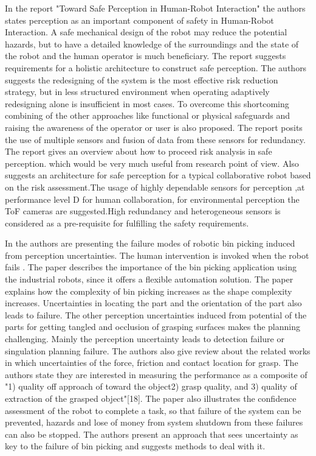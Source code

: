 {In the report "Toward Safe Perception in Human-Robot Interaction" \cite{author17} the authors states perception as an important component of safety in Human-Robot Interaction. A safe mechanical design of the robot may reduce the potential hazards, but to have a detailed knowledge of the surroundings and the state of the robot and the human operator is much beneficiary. The report suggests requirements for a holistic architecture to construct safe perception. The authors suggests the redesigning of the system is the most effective risk reduction strategy, but in less structured environment when operating adaptively redesigning alone is insufficient in most cases. To overcome this shortcoming combining of the other approaches like functional or physical safeguards and raising the awareness of the operator or user is also proposed. The report posits the use of multiple sensors and fusion of data from these sensors for redundancy. The report gives an overview about how to proceed risk analysis in safe perception. which would be very much useful from research point of view. Also suggests an architecture for safe perception for a typical collaborative robot based on the risk assessment.The usage of highly dependable sensors for perception ,at performance level D for human collaboration, for environmental perception the ToF cameras are suggested.High redundancy and heterogeneous sensors is considered as a pre-requisite for fulfilling the safety requirements. 

In\cite{author18} the authors are presenting the failure modes of robotic bin picking induced from perception uncertainties. The human intervention is invoked when the robot fails . The paper describes the importance of the bin picking application using the industrial robots, since it offers a flexible automation solution. The paper explains how the complexity of bin picking increases as the shape complexity increases. Uncertainties in locating the part and the orientation of the part also leads to failure. The other perception uncertainties induced from potential of the parts for getting tangled and occlusion of grasping surfaces makes the planning challenging. Mainly the perception uncertainty leads to detection failure or singulation planning failure. The authors also give review about the related works in which uncertainties of the force, friction and contact location for grasp. The authors state they are interested in measuring the performance as a composite of "1) quality off approach of toward the object2) grasp quality, and 3) quality of extraction of the grasped object"[18]. The paper also illustrates the confidence assessment of the robot to complete a task, so that failure of the system can be prevented, hazards and lose of money from system shutdown from these failures can also be stopped. The authors present an approach that sees uncertainty as key to the failure of bin picking and suggests methods to deal with it.

}
